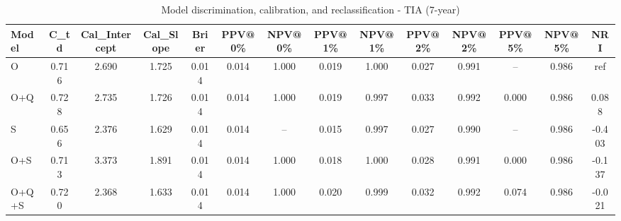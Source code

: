 \begin{table}[htbp]
\centering
\small
\caption{Model discrimination, calibration, and reclassification - TIA (7-year)}
\label{tab:perf_tia_7y}
\begin{tabular}{lccccccccccccc}
\toprule
Model & C\_td & Cal\_Intercept & Cal\_Slope & Brier & PPV@0\% & NPV@0\% & PPV@1\% & NPV@1\% & PPV@2\% & NPV@2\% & PPV@5\% & NPV@5\% & NRI \\
\midrule
O & 0.716 & 2.690 & 1.725 & 0.014 & 0.014 & 1.000 & 0.019 & 1.000 & 0.027 & 0.991 & -- & 0.986 & ref \\
O+Q & 0.728 & 2.735 & 1.726 & 0.014 & 0.014 & 1.000 & 0.019 & 0.997 & 0.033 & 0.992 & 0.000 & 0.986 & 0.088 \\
S & 0.656 & 2.376 & 1.629 & 0.014 & 0.014 & -- & 0.015 & 0.997 & 0.027 & 0.990 & -- & 0.986 & -0.403 \\
O+S & 0.713 & 3.373 & 1.891 & 0.014 & 0.014 & 1.000 & 0.018 & 1.000 & 0.028 & 0.991 & 0.000 & 0.986 & -0.137 \\
O+Q+S & 0.720 & 2.368 & 1.633 & 0.014 & 0.014 & 1.000 & 0.020 & 0.999 & 0.032 & 0.992 & 0.074 & 0.986 & -0.021 \\
\bottomrule
\end{tabular}
\end{table}